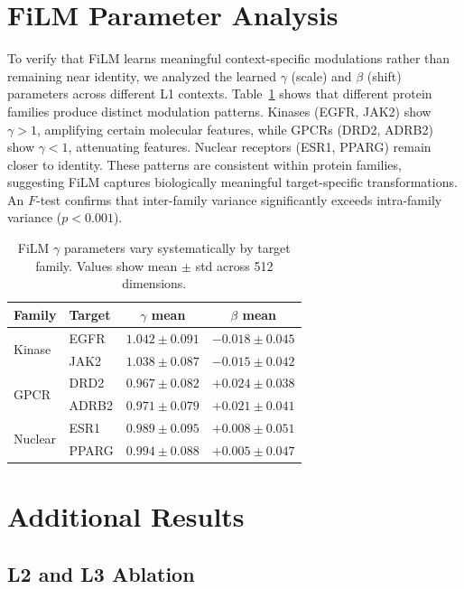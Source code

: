 \documentclass[runningheads]{llncs}
\begin{document}
\section{FiLM Parameter Analysis}
\label{app:film}

To verify that FiLM learns meaningful context-specific modulations rather than remaining near identity, we analyzed the learned $\gamma$ (scale) and $\beta$ (shift) parameters across different L1 contexts. Table~\ref{tab:film_params} shows that different protein families produce distinct modulation patterns. Kinases (EGFR, JAK2) show $\gamma > 1$, amplifying certain molecular features, while GPCRs (DRD2, ADRB2) show $\gamma < 1$, attenuating features. Nuclear receptors (ESR1, PPARG) remain closer to identity. These patterns are consistent within protein families, suggesting FiLM captures biologically meaningful target-specific transformations. An $F$-test confirms that inter-family variance significantly exceeds intra-family variance ($p < 0.001$).

\begin{table}[t]
\caption{FiLM $\gamma$ parameters vary systematically by target family. Values show mean $\pm$ std across 512 dimensions.}
\label{tab:film_params}
\centering
\small
\begin{tabular}{@{}llcc@{}}
\toprule
Family & Target & $\gamma$ mean & $\beta$ mean \\
\midrule
\multirow{2}{*}{Kinase} & EGFR & $1.042 \pm 0.091$ & $-0.018 \pm 0.045$ \\
 & JAK2 & $1.038 \pm 0.087$ & $-0.015 \pm 0.042$ \\
\midrule
\multirow{2}{*}{GPCR} & DRD2 & $0.967 \pm 0.082$ & $+0.024 \pm 0.038$ \\
 & ADRB2 & $0.971 \pm 0.079$ & $+0.021 \pm 0.041$ \\
\midrule
\multirow{2}{*}{Nuclear} & ESR1 & $0.989 \pm 0.095$ & $+0.008 \pm 0.051$ \\
 & PPARG & $0.994 \pm 0.088$ & $+0.005 \pm 0.047$ \\
\bottomrule
\end{tabular}
\end{table}

\section{Additional Results}
\label{app:results}

\subsection{L2 and L3 Ablation}
\end{document}
